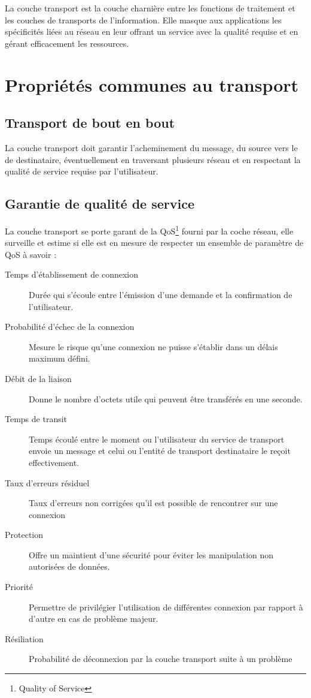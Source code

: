\documentclass[12pt,a4paper,openany]{book}
\begin{document}
	La couche transport est la couche charnière entre les fonctions de traitement et les couches de transports de l'information. Elle masque aux
	applications les spécificités liées au réseau en leur offrant un service avec la qualité requise et en gérant efficacement les ressources.
	
	\section{Propriétés communes au transport}
	\subsection{Transport de bout en bout}
	La couche transport doit garantir l'acheminement du message, du source vers le de destinataire, éventuellement en traversant plusieurs réseau et en
	respectant la qualité de service requise par l'utilisateur.

	\subsection{Garantie de qualité de service}
	La couche transport se porte garant de la QoS\footnote{Quality of Service} fourni par la coche réseau, elle surveille et estime si elle est en
	mesure de respecter un ensemble de paramètre de QoS à savoir : 
	\begin{description}
		\item[Temps d'établissement de connexion] Durée qui s'écoule entre l'émission d'une demande et la confirmation de l'utilisateur.
		\item[Probabilité d'échec de la connexion] Mesure le risque qu'une connexion ne puisse s'établir dans un délais maximum défini.
		\item[Débit de la liaison] Donne le nombre d'octets utile qui peuvent être transférés en une seconde.
		\item[Temps de transit] Temps écoulé entre le moment ou l'utilisateur du service de transport envoie un message et celui ou l'entité de
			transport destinataire le reçoit effectivement.
		\item[Taux d'erreurs résiduel] Taux d'erreurs non corrigées qu'il est possible de rencontrer sur une connexion
		\item[Protection] Offre un maintient d'une sécurité pour éviter les manipulation non autorisées de données.
		\item[Priorité] Permettre de privilégier l'utilisation de différentes connexion par rapport à d'autre en cas de problème majeur.
		\item[Résiliation] Probabilité de déconnexion par la couche transport suite à un problème 
	\end{description}
\end{document}
